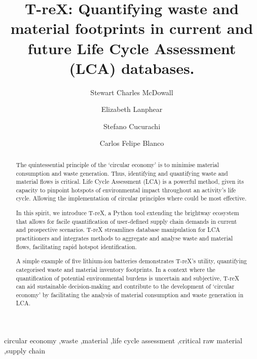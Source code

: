 \documentclass[review,3p,authoryear]{elsarticle}
\begin{document}
\begin{frontmatter}

    \title{T-reX: Quantifying waste and material footprints in current and future Life Cycle Assessment (LCA) databases.\@}
    \author[1]{Stewart Charles McDowall}
    \author[1]{Elizabeth Lanphear}
    \author[1]{Stefano Cucurachi}
    \author[1]{Carlos Felipe Blanco}



    \begin{abstract}
        The quintessential principle of the `circular economy' is to minimise material consumption and waste generation. Thus, identifying and quantifying waste and material flows is critical. Life Cycle Assessment (LCA) is a powerful method, given its capacity to pinpoint hotspots of environmental impact throughout an activity's life cycle. Allowing the implementation of circular principles where could be most effective.

        In this spirit, we introduce T-reX, a Python tool extending the brightway ecosystem that allows for facile quantification of user-defined supply chain demands in current and prospective scenarios. T-reX streamlines database manipulation for LCA practitioners and integrates methods to aggregate and analyse waste and material flows, facilitating rapid hotspot identification.

        A simple example of five lithium-ion batteries demonstrates T-reX's utility, quantifying categorised waste and material inventory footprints. In a context where the quantification of potential environmental burdens is uncertain and subjective, T-reX can aid sustainable decision-making and contribute to the development of `circular economy' by facilitating the analysis of material consumption and waste generation in LCA.


    \end{abstract}

    \begin{keyword}
        circular economy \sep{}waste \sep{}material \sep{}life cycle assessment \sep{}critical raw material \sep{}supply chain
    \end{keyword}

\end{frontmatter}
\end{document}
